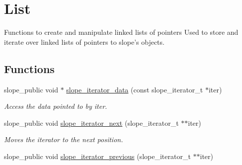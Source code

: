 \hypertarget{group__List}{\section{List}
\label{group__List}
}


Functions to create and manipulate linked lists of pointers Used to store and iterate over linked lists of pointers to slope's objects.  


\subsection*{Functions}
\begin{DoxyCompactItemize}
\item 
slope\+\_\+public void $\ast$ \hyperlink{group__List_ga33ad9bae82e595e65a1ffe4bf7168a84}{slope\+\_\+iterator\+\_\+data} (const slope\+\_\+iterator\+\_\+t $\ast$iter)
\begin{DoxyCompactList}\small\item\em Access the data pointed to by iter. \end{DoxyCompactList}\item 
\hypertarget{group__List_gae0daa8d0f64b26df51cbae035578ca55}{slope\+\_\+public void \hyperlink{group__List_gae0daa8d0f64b26df51cbae035578ca55}{slope\+\_\+iterator\+\_\+next} (slope\+\_\+iterator\+\_\+t $\ast$$\ast$iter)}\label{group__List_gae0daa8d0f64b26df51cbae035578ca55}

\begin{DoxyCompactList}\small\item\em Moves the iterator to the next position. \end{DoxyCompactList}\item 
\hypertarget{group__List_ga32395735bd64e9e085a4e70ebaf96a1d}{slope\+\_\+public void \hyperlink{group__List_ga32395735bd64e9e085a4e70ebaf96a1d}{slope\+\_\+iterator\+\_\+previous} (slope\+\_\+iterator\+\_\+t $\ast$$\ast$iter)}\label{group__List_ga32395735bd64e9e085a4e70ebaf96a1d}


\end{DoxyCompactItemize}
